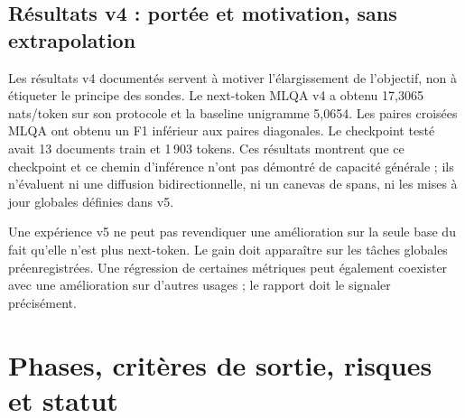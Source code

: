 \documentclass[11pt,a4paper,oneside]{report}
\begin{document}
\chapter{Résultats v4 : portée et motivation, sans extrapolation}
Les résultats v4 documentés servent à motiver l'élargissement de l'objectif, non à étiqueter le principe des sondes. Le next-token MLQA v4 a obtenu 17,3065 nats/token sur son protocole et la baseline unigramme 5,0654. Les paires croisées MLQA ont obtenu un F1 inférieur aux paires diagonales. Le checkpoint testé avait 13 documents train et 1\,903 tokens. Ces résultats montrent que ce checkpoint et ce chemin d'inférence n'ont pas démontré de capacité générale ; ils n'évaluent ni une diffusion bidirectionnelle, ni un canevas de spans, ni les mises à jour globales définies dans v5.

Une expérience v5 ne peut pas revendiquer une amélioration sur la seule base du fait qu'elle n'est plus next-token. Le gain doit apparaître sur les tâches globales préenregistrées. Une régression de certaines métriques peut également coexister avec une amélioration sur d'autres usages ; le rapport doit le signaler précisément.

\part{Phases, critères de sortie, risques et statut}
\end{document}
